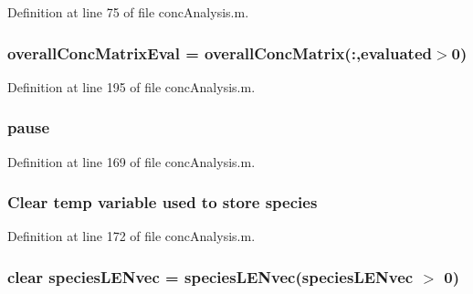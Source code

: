 Definition at line 75 of file conc\+Analysis.\+m.

\hypertarget{a00025_ad9fb43d1f2f660ac0e99cc638e5ac774}{
\subsubsection[{overall\+Conc\+Matrix\+Eval}]{\setlength{\rightskip}{0pt plus 5cm}overall\+Conc\+Matrix\+Eval = {\bf overall\+Conc\+Matrix}(\+:,{\bf evaluated}$>$0)}}\label{a00025_ad9fb43d1f2f660ac0e99cc638e5ac774}


Definition at line 195 of file conc\+Analysis.\+m.

\hypertarget{a00025_afd7d49e17b69bd6bf3d7a649856c1067}{
\subsubsection[{pause}]{\setlength{\rightskip}{0pt plus 5cm}pause}}\label{a00025_afd7d49e17b69bd6bf3d7a649856c1067}


Definition at line 169 of file conc\+Analysis.\+m.

\hypertarget{a00025_a0e465545a27eaf9ca2c9710f744963c4}{
\subsubsection[{species}]{\setlength{\rightskip}{0pt plus 5cm}Clear temp variable used {\bf to} store {\bf species}}}\label{a00025_a0e465545a27eaf9ca2c9710f744963c4}


Definition at line 172 of file conc\+Analysis.\+m.

\hypertarget{a00025_a728fdfd72d1bd5110134afd6e09e99da}{
\subsubsection[{species\+L\+E\+Nvec}]{\setlength{\rightskip}{0pt plus 5cm}clear species\+L\+E\+Nvec = species\+L\+E\+Nvec(species\+L\+E\+Nvec $>$ 0)}}\label{a00025_a728fdfd72d1bd5110134afd6e09e99da}


